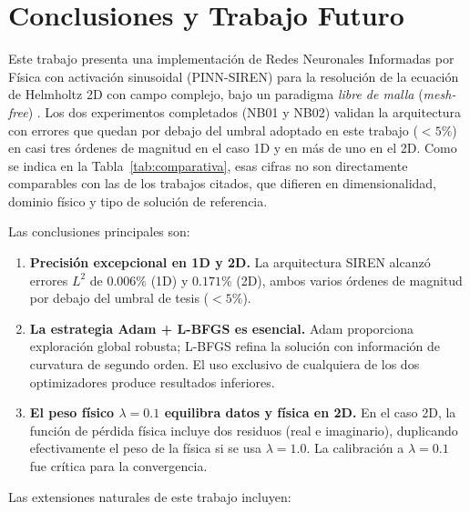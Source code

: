 
\section{Conclusiones y Trabajo Futuro}
\label{sec:conclusiones}

Este trabajo presenta una implementación de Redes Neuronales Informadas por Física
con activación sinusoidal (PINN-SIREN) para la resolución de la ecuación de Helmholtz
2D con campo complejo, bajo un paradigma \textit{libre de malla} (\textit{mesh-free})
\cite{Karniadakis2021_review, Cuomo2022_review}.
Los dos experimentos completados (NB01 y NB02) validan la arquitectura con
errores que quedan por debajo del umbral adoptado en este trabajo ($<5\%$) en
casi tres órdenes de magnitud en el caso 1D y en más de uno en el 2D. Como se
indica en la Tabla~\ref{tab:comparativa}, esas cifras no son directamente
comparables con las de los trabajos citados, que difieren en dimensionalidad,
dominio físico y tipo de solución de referencia.

Las conclusiones principales son:

\begin{enumerate}
  \item \textbf{Precisión excepcional en 1D y 2D.}
    La arquitectura SIREN alcanzó errores $L^2$ de $0.006\%$ (1D) y $0.171\%$ (2D),
    ambos varios órdenes de magnitud por debajo del umbral de tesis ($< 5\%$).

  \item \textbf{La estrategia Adam + L-BFGS es esencial.}
    Adam proporciona exploración global robusta; L-BFGS refina la solución con
    información de curvatura de segundo orden.
    El uso exclusivo de cualquiera de los dos optimizadores produce resultados inferiores.

  \item \textbf{El peso físico $\lambda = 0.1$ equilibra datos y física en 2D.}
    En el caso 2D, la función de pérdida física incluye dos residuos (real e imaginario),
    duplicando efectivamente el peso de la física si se usa $\lambda = 1.0$.
    La calibración a $\lambda = 0.1$ fue crítica para la convergencia.
\end{enumerate}

Las extensiones naturales de este trabajo incluyen:

